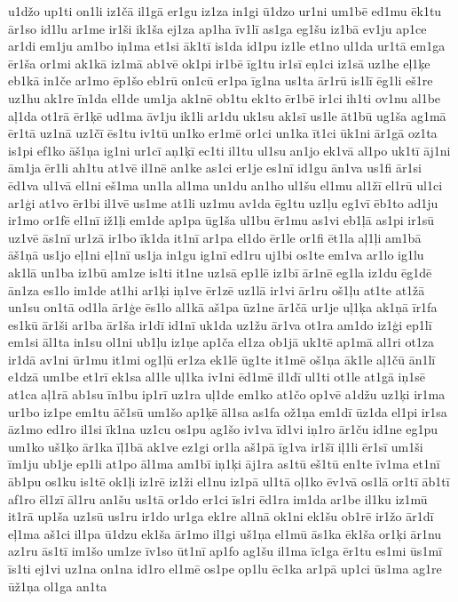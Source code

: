 {u1džo
up1ti
on1li
iz1čā
il1gā
er1gu
iz1za
in1gi
ū1dzo
ur1ni
um1bē
ed1mu
ēk1tu
ār1so
id1lu
ar1me
ir1ši
ik1ša
ej1za
ap1ha
īv1lī
as1ga
eg1šu
iz1bā
ev1ju
ap1ce
ar1di
em1ju
am1bo
iņ1ma
et1si
āk1tī
is1da
id1pu
iz1le
et1no
ul1da
ur1tā
em1ga
ēr1ša
or1mi
ak1kā
iz1mā
ab1vē
ok1pi
ir1bē
īg1tu
ir1sī
eņ1ci
iz1sā
uz1he
eļ1ķe
eb1kā
in1če
ar1mo
ēp1šo
eb1rū
on1cū
er1pa
īg1na
us1ta
ār1rū
is1lī
ēg1li
eš1re
uz1hu
ak1re
īn1da
el1de
um1ja
ak1nē
ob1tu
ek1to
ēr1bē
ir1ci
ih1ti
ov1nu
al1be
aļ1da
ot1rā
ēr1ķē
ud1ma
āv1ju
ik1li
ar1du
uk1su
ak1sī
us1le
āt1bū
ug1ša
ag1mā
ēr1tā
uz1nā
uz1čī
ēs1tu
iv1tū
un1ko
er1mē
or1ci
un1ka
īt1ci
ūk1ni
ār1gā
oz1ta
is1pi
ef1ko
āš1ņa
ig1ni
ur1cī
aņ1ķī
ec1ti
il1tu
ul1su
an1jo
ek1vā
al1po
uk1tī
āj1ni
ām1ja
ēr1li
ah1tu
at1vē
il1nē
an1ke
as1ci
er1je
es1nī
id1gu
ān1va
us1fi
ār1si
ēd1va
ul1vā
el1ni
eš1ma
un1la
al1ma
un1du
an1ho
ul1šu
el1mu
al1žī
el1rū
ul1ci
ar1ģi
at1vo
ēr1bi
il1vē
us1me
at1li
uz1mu
av1da
ēg1tu
uz1ļu
eg1vī
ēb1to
ad1ju
ir1mo
or1fē
el1nī
iž1ļi
em1de
ap1pa
ūg1ša
ul1bu
ēr1mu
as1vi
eb1ļā
as1pi
ir1sū
uz1vē
ās1nī
ur1zā
ir1bo
īk1da
it1nī
ar1pa
el1do
ēr1le
or1fi
ēt1la
aļ1ļi
am1bā
āš1ņā
us1jo
eļ1ni
eļ1nī
us1ja
in1gu
ig1nī
ed1ru
uj1bi
os1te
em1va
ar1lo
ig1lu
ak1lā
un1ba
iz1bū
am1ze
is1ti
it1ne
uz1sā
ep1lē
iz1bī
ār1nē
eg1la
iz1du
ēg1dē
ān1za
es1lo
im1de
at1hi
ar1ķi
iņ1ve
ēr1zē
uz1lā
ir1vi
ār1ru
oš1ļu
at1te
at1žā
un1su
on1tā
od1la
ār1ģe
ēs1lo
al1kā
aš1pa
ūz1ne
ār1čā
ur1je
uļ1ķa
ak1ņā
īr1fa
es1kū
ār1ši
ar1ba
ār1ša
ir1dī
id1nī
uk1da
uz1žu
ār1va
ot1ra
am1do
iz1ģi
ep1lī
em1si
āl1ta
in1su
ol1ni
ub1ļu
iz1ņe
ap1ča
el1za
ob1jā
uk1tē
ap1mā
al1ri
ot1za
ir1dā
av1ni
ūr1mu
it1mi
og1ļū
er1za
ek1lē
ūg1te
it1mē
oš1ņa
āk1le
aļ1čū
ān1lī
e1dzā
um1be
et1rī
ek1sa
al1le
uļ1ka
iv1ni
ēd1mē
il1dī
ul1ti
ot1le
at1gā
iņ1sē
at1ca
aļ1rā
ab1su
īn1bu
ip1rī
uz1ra
uļ1de
em1ko
at1čo
op1vē
a1džu
uz1ķi
ir1ma
ur1bo
iz1pe
em1tu
āč1sū
um1šo
ap1ķē
āl1sa
as1fa
ož1ņa
em1dī
ūz1da
el1pi
ir1sa
āz1mo
ed1ro
il1si
īk1na
uz1cu
os1pu
ag1šo
iv1va
īd1vi
iņ1ro
ār1ču
id1ne
eg1pu
um1ko
uš1ķo
ār1ka
īļ1bā
ak1ve
ez1gi
or1la
aš1pā
īg1va
ir1šī
iļ1li
ēr1sī
um1ši
īm1ju
ub1je
ep1li
at1po
āl1ma
am1bī
iņ1ķi
āj1ra
as1tū
eš1tū
en1te
īv1ma
et1nī
āb1pu
os1ku
is1tē
ok1ļi
iz1rē
iz1ži
el1nu
iz1pā
ul1tā
oļ1ko
ēv1vā
os1lā
or1tī
āb1tī
af1ro
ēl1zī
āl1ru
an1šu
us1tā
or1do
er1ci
īs1ri
ēd1ra
im1da
ar1be
il1ku
iz1mū
it1rā
up1ša
uz1sū
us1ru
ir1do
ur1ga
ek1re
al1nā
ok1ni
ek1šu
ob1rē
ir1žo
ār1dī
eļ1ma
aš1ci
il1pa
ū1dzu
ek1ša
ār1mo
il1gi
uš1ņa
el1mū
ās1ka
ēk1ša
or1ķi
ār1nu
az1ru
ās1tī
im1šo
um1ze
īv1so
ūt1nī
ap1fo
ag1šu
il1ma
īc1ga
ēr1tu
es1mi
ūs1mī
īs1ti
ej1vi
uz1na
on1na
id1ro
el1mē
os1pe
op1lu
ēc1ka
ar1pā
up1ci
ūs1ma
ag1re
ūž1ņa
ol1ga
an1ta
}
